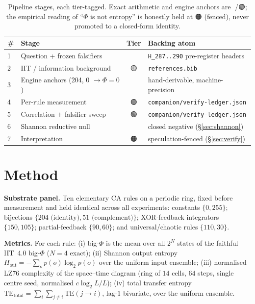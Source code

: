 \documentclass[11pt,a4paper]{article}
\providecommand{\tierBlue}{🔵}
\providecommand{\tierGreen}{🟢}
\providecommand{\tierYellow}{🟡}
\providecommand{\tierOrange}{🟠}
\providecommand{\tierRed}{🔴}
\newcommand{\bigphi}{\ensuremath{\Phi}}
\begin{document}
\medskip
\begin{table}[h]
\centering
\small
\begin{tabular}{@{}>{\centering\arraybackslash}m{0.4cm} >{\raggedright\arraybackslash}m{4.6cm} c >{\raggedright\arraybackslash}m{5.6cm}@{}}
\toprule
\textbf{\#} & \textbf{Stage} & \textbf{Tier} & \textbf{Backing atom} \\
\midrule
\textcircled{\scriptsize 1} & Question + frozen falsifiers  & \tierBlue   & \texttt{H\_287..290} pre-register headers \\
\textcircled{\scriptsize 2} & IIT / information background  & \tierYellow & \texttt{references.bib} \\
\textcircled{\scriptsize 3} & Engine anchors (204, 0 \(\to\bigphi{=}0\)) & \tierBlue   & hand-derivable, machine-precision \\
\textcircled{\scriptsize 4} & Per-rule measurement          & \tierGreen  & \texttt{companion/verify-ledger.json} \\
\textcircled{\scriptsize 5} & Correlation \(+\) falsifier sweep & \tierGreen  & \texttt{companion/verify-ledger.json} \\
\textcircled{\scriptsize 6} & Shannon reductive null        & \tierRed    & closed negative (\S\ref{sec:shannon}) \\
\textcircled{\scriptsize 7} & Interpretation                & \tierOrange & speculation-fenced (\S\ref{sec:verify}) \\
\bottomrule
\end{tabular}
\caption{Pipeline stages, each tier-tagged. Exact arithmetic and engine
anchors are \tierBlue/\tierGreen; the empirical reading of ``\bigphi{} is
not entropy'' is honestly held at \tierOrange{} (fenced), never promoted to
a closed-form identity.}
\label{tab:pipeline}
\end{table}

\section{Method}
\label{sec:method}

\textbf{Substrate panel.} Ten elementary CA rules on a periodic ring,
fixed before measurement and held identical across all experiments:
constants \(\{0,255\}\); bijections \(\{204\text{ (identity)},
51\text{ (complement)}\}\); XOR-feedback integrators \(\{150,105\}\);
partial-feedback \(\{90,60\}\); and universal/chaotic rules \(\{110,30\}\).

\textbf{Metrics.} For each rule: (i) big-\bigphi{} is the mean over all
\(2^N\) states of the faithful IIT~4.0 big-\bigphi{} (\(N=4\) exact);
(ii) Shannon output entropy \(H_\mathrm{out}=-\sum_o p(o)\log_2 p(o)\)
over the uniform input ensemble; (iii) normalised LZ76 complexity of the
space--time diagram (ring of \(14\) cells, \(64\) steps, single centre
seed, normalised \(c\log_2 L/L\)); (iv) total transfer entropy
\(\mathrm{TE}_\mathrm{total}=\sum_{i}\sum_{j\neq i}\mathrm{TE}(j\!\to\!i)\),
lag-1 bivariate, over the uniform ensemble.
\end{document}
